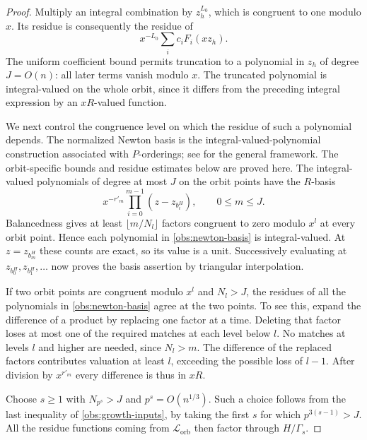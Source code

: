 \begin{proof}
Multiply an integral combination by $z_h^{L_0}$, which is congruent
to one modulo $x$.  Its residue is consequently the residue of
\[
 x^{-L_0}\sum_i c_iF_i(xz_h).
\]
The uniform coefficient bound permits truncation to a polynomial
in $z_h$ of degree $J=O(n)$: all later terms vanish modulo $x$.
The truncated polynomial is integral-valued on the whole orbit,
since it differs from the preceding integral expression by an
$xR$-valued function.

We next control the congruence level on which the residue of such
a polynomial depends.  The normalized Newton basis is the
integral-valued-polynomial construction associated with $P$-orderings;
see \cite[\S11, Theorem~24]{Bhargava2000} for the general framework.
The orbit-specific bounds and residue estimates below are proved here.
The integral-valued polynomials of degree
at most $J$ on the orbit points have the $R$-basis
\begin{equation}
\label{obs:newton-basis}
 x^{-r'_m}\prod_{i=0}^{m-1}(z-z_{b_i^H}),
 \qquad 0\leq m\leq J.
\end{equation}
Balancedness gives at least $\lfloor m/N_l\rfloor$ factors
congruent to zero modulo $x^l$ at every orbit point.  Hence each
polynomial in \eqref{obs:newton-basis} is integral-valued.
At $z=z_{b_m^H}$ these counts are exact, so its value is a unit.
Successively evaluating at $z_{b_0^H},z_{b_1^H},\ldots$ now proves
the basis assertion by triangular interpolation.

If two orbit points are congruent modulo $x^l$ and $N_l>J$, the
residues of all the polynomials in \eqref{obs:newton-basis} agree
at the two points.  To see this, expand the difference of a product
by replacing one factor at a time.  Deleting that factor loses
at most one of the required matches at each level below $l$.
No matches at levels $l$ and higher are needed, since $N_l>m$.
The difference of the replaced factors contributes valuation at
least $l$, exceeding the possible loss of $l-1$.  After division
by $x^{r'_m}$ every difference is thus in $xR$.

Choose $s\geq1$ with $N_{p^s}>J$ and
$p^s=O(n^{1/3})$.  Such a choice follows from the last inequality
of \eqref{obs:growth-inputs}, by taking the first $s$ for which
$p^{3(s-1)}>J$.  All the residue functions coming from
$\mathcal L_{\mathrm{orb}}$ then factor through $H/\Gamma_s$.


\end{proof}
